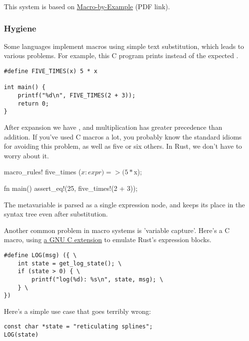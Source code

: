 \blank

This system is based on \href{https://www.cs.indiana.edu/ftp/techreports/TR206.pdf}{Macro-by-Example} (PDF link).

\subsubsection*{Hygiene}

Some languages implement macros using simple text substitution, which leads to various problems. For example, this C program prints 
 instead of the expected .

\begin{verbatim}
#define FIVE_TIMES(x) 5 * x

int main() {
    printf("%d\n", FIVE_TIMES(2 + 3));
    return 0;
}
\end{verbatim}

After expansion we have , and multiplication has greater precedence than addition. If you've used C macros a lot, you 
probably know the standard idioms for avoiding this problem, as well as five or six others. In Rust, we don't have to worry about it.

\begin{rustc}
macro_rules! five_times {
    ($x:expr) => (5 * $x);
}

fn main() {
    assert_eq!(25, five_times!(2 + 3));
}
\end{rustc}

The metavariable  is parsed as a single expression node, and keeps its place in the syntax tree even after substitution.

\blank

Another common problem in macro systems is 'variable capture'. Here's a C macro, using 
\href{https://gcc.gnu.org/onlinedocs/gcc/Statement-Exprs.html}{a GNU C extension} to emulate Rust's expression blocks.

\begin{verbatim}
#define LOG(msg) ({ \
    int state = get_log_state(); \
    if (state > 0) { \
        printf("log(%d): %s\n", state, msg); \
    } \
})
\end{verbatim}

Here's a simple use case that goes terribly wrong:

\begin{verbatim}
const char *state = "reticulating splines";
LOG(state)
\end{verbatim}

